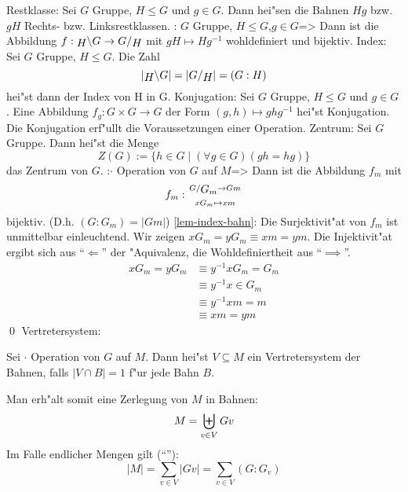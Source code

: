  Restklasse:{
  Sei $G$ Gruppe, $H\le G$ und $g\in G$. Dann hei"sen die Bahnen $Hg$ bzw.
  $gH$ Rechts- bzw. Linksrestklassen.
  }
\lemma:
  $G$ Gruppe, $H\le G$,$g\in G$=>{
  Dann ist die Abbildung $f:\lcoset G H\to\rcoset G H$ mit $gH\mapsto Hg^{-1}$ 
  wohldefiniert und bijektiv.
  }
 Index:{
  Sei $G$ Gruppe, $H\le G$. Die Zahl
  \[|\lcoset G H|=|\rcoset G H|=(G:H)
    \]
  hei"st dann der Index von H in G.
  }
 Konjugation:{
  Sei $G$ Gruppe, $H\le G$ und $g\in G$.
  Eine Abbildung $f_g:G\times G\to G$ der Form $(g,h)\mapsto ghg^{-1}$ hei"st
  Konjugation. Die Konjugation erf"ullt die Voraussetzungen einer Operation.
  }
 Zentrum:{
  Sei $G$ Gruppe. Dann hei"st die Menge
  \[Z(G):=\{h\in G\mid (\forall g\in G)(gh=hg)\}
    \]
  das Zentrum von $G$.
  }
\lemma:$\cdot$ Operation von $G$ auf $M$=> {
  \label{lem-index-bahn}
  Dann ist die Abbildung $f_m$ mit
  \[f_m:\stack(\rcoset G {G_m}\to Gm;xG_m\mapsto xm)
    \]
  bijektiv. (D.h. $(G:G_m)=|Gm|$)
  }
\proof\ref{lem-index-bahn}:{
  Die Surjektivit"at von $f_m$ ist unmittelbar einleuchtend.
  Wir zeigen $xG_m=yG_m\equiv xm=ym$. Die Injektivit"at ergibt sich aus 
  ``$\Leftarrow$'' der "Aquivalenz, die Wohldefiniertheit aus ``$\implies$''.
  \begin{align*}
    xG_m=yG_m &\equiv y^{-1}xG_m=G_m \\
    &\equiv y^{-1}x\in G_m \\
    &\equiv y^{-1}xm=m \\
    &\equiv xm=ym
  \end{align*}\qed
  }
 Vertretersystem:{
  Sei $\cdot$ Operation von $G$ auf $M$. Dann hei"st $V\subseteq M$ ein
  Vertretersystem der Bahnen, falls $|V\cap B|=1$ f"ur jede Bahn $B$.
  
  Man erh"alt somit eine Zerlegung von $M$ in Bahnen:
  \[M=\biguplus_{v\in V} Gv
    \]
  Im Falle endlicher Mengen gilt (``''):
  \[|M|=\sum_{v\in V} |Gv|=\sum_{v\in V} (G:G_v)
    \]
  }
